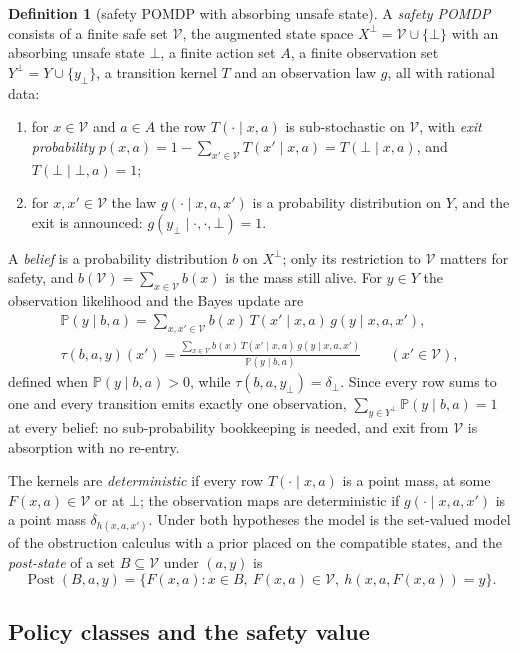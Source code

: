 \documentclass[11pt,a4paper]{article}
\theoremstyle{plain}
\theoremstyle{definition}
\newtheorem{definition}[theorem]{Definition}
\theoremstyle{remark}
\newcommand{\Prob}{\mathbb{P}}
\newcommand{\calV}{\mathcal{V}}
\newcommand{\Post}{\operatorname{Post}}
\begin{document}
\begin{definition}[safety POMDP with absorbing unsafe state]\label{def:model}
A \emph{safety POMDP} consists of a finite safe set $\calV$, the augmented state space $X^{\bot}=\calV\cup\{\bot\}$ with an absorbing unsafe state $\bot$, a finite action set $A$, a finite observation set $Y^{\bot}=Y\cup\{y_{\bot}\}$, a transition kernel $T$ and an observation law $g$, all with rational data:
\begin{enumerate}[leftmargin=1.6em,itemsep=1pt]
\item for $x\in\calV$ and $a\in A$ the row $T(\cdot\mid x,a)$ is sub-stochastic on $\calV$, with \emph{exit probability} $p(x,a)=1-\sum_{x'\in\calV}T(x'\mid x,a)=T(\bot\mid x,a)$, and $T(\bot\mid\bot,a)=1$;
\item for $x,x'\in\calV$ the law $g(\cdot\mid x,a,x')$ is a probability distribution on $Y$, and the exit is announced: $g(y_{\bot}\mid\cdot,\cdot,\bot)=1$.
\end{enumerate}
A \emph{belief} is a probability distribution $b$ on $X^{\bot}$; only its restriction to $\calV$ matters for safety, and $b(\calV)=\sum_{x\in\calV}b(x)$ is the mass still alive. For $y\in Y$ the observation likelihood and the Bayes update are
\begin{gather*}
\Prob(y\mid b,a)=\sum_{x,x'\in\calV}b(x)\,T(x'\mid x,a)\,g(y\mid x,a,x'),\\
\tau(b,a,y)(x')=\frac{\sum_{x\in\calV}b(x)\,T(x'\mid x,a)\,g(y\mid x,a,x')}{\Prob(y\mid b,a)}\qquad(x'\in\calV),
\end{gather*}
defined when $\Prob(y\mid b,a)>0$, while $\tau(b,a,y_{\bot})=\delta_{\bot}$. Since every row sums to one and every transition emits exactly one observation, $\sum_{y\in Y^{\bot}}\Prob(y\mid b,a)=1$ at every belief: no sub-probability bookkeeping is needed, and exit from $\calV$ is absorption with no re-entry.
\end{definition}

The kernels are \emph{deterministic} if every row $T(\cdot\mid x,a)$ is a point mass, at some $F(x,a)\in\calV$ or at $\bot$; the observation maps are deterministic if $g(\cdot\mid x,a,x')$ is a point mass $\delta_{h(x,a,x')}$. Under both hypotheses the model is the set-valued model of the obstruction calculus \cite{Abaee2026calc} with a prior placed on the compatible states, and the \emph{post-state} of a set $B\subseteq\calV$ under $(a,y)$ is
\[
\Post(B,a,y)=\{F(x,a):x\in B,\ F(x,a)\in\calV,\ h(x,a,F(x,a))=y\}.
\]

\subsection{Policy classes and the safety value}
\end{document}
